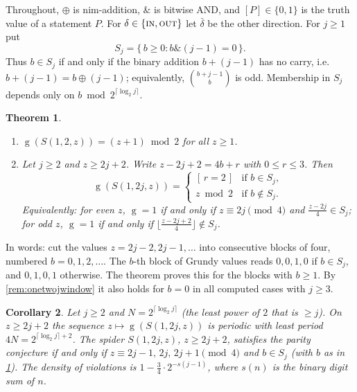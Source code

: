 \documentclass[11pt]{amsart}
\newtheorem{theorem}{Theorem}[section]
\newtheorem{corollary}[theorem]{Corollary}
\theoremstyle{definition}
\theoremstyle{remark}
\newcommand{\gv}{\operatorname{g}}           %
\newcommand{\Sp}{S}
\newcommand{\IN}{\textup{\textsc{in}}}
\newcommand{\OUT}{\textup{\textsc{out}}}
\begin{document}
Throughout, $\oplus$ is nim-addition, $\mathbin{\&}$ is bitwise AND, and $[P]\in\{0,1\}$ is the truth value of a statement $P$. For $\delta\in\{\IN,\OUT\}$ let $\bar\delta$ be the other direction. For $j\ge1$ put
\[
  S_j=\{\,b\ge 0 : b \mathbin{\&} (j-1)=0\,\}.
\]
Thus $b\in S_j$ if and only if the binary addition $b+(j-1)$ has no carry, i.e.\ $b+(j-1)=b\oplus(j-1)$; equivalently, $\binom{b+j-1}{b}$ is odd. Membership in $S_j$ depends only on $b \bmod 2^{\lceil\log_2 j\rceil}$.

\begin{theorem}\label{thm:onetwoj}
\leavevmode
\begin{enumerate}[label=\textup{(\alph*)}]
\item $\gv(\Sp(1,2,z))=(z+1)\bmod 2$ for all $z\ge1$.
\item Let $j\ge 2$ and $z\ge 2j+2$. Write $z-2j+2=4b+r$ with $0\le r\le 3$. Then
\[
  \gv(\Sp(1,2j,z))=\begin{cases} [\,r=2\,] & \text{if } b\in S_j,\\ z\bmod 2 & \text{if } b\notin S_j.\end{cases}
\]
Equivalently: for even $z$, $\gv=1$ if and only if $z\equiv 2j\pmod 4$ and $\tfrac{z-2j}{4}\in S_j$; for odd $z$, $\gv=1$ if and only if $\lfloor\tfrac{z-2j+2}{4}\rfloor\notin S_j$.
\end{enumerate}
\end{theorem}

In words: cut the values $z=2j-2,2j-1,\dots$ into consecutive blocks of four, numbered $b=0,1,2,\dots$. The $b$-th block of Grundy values reads $0,0,1,0$ if $b\in S_j$, and $0,1,0,1$ otherwise. The theorem proves this for the blocks with $b\ge1$. By \cref{rem:onetwojwindow} it also holds for $b=0$ in all computed cases with $j\ge3$.

\begin{corollary}\label{cor:onetwojperiod}
Let $j\ge2$ and $N=2^{\lceil \log_2 j\rceil}$ (the least power of $2$ that is $\ge j$). On $z\ge 2j+2$ the sequence $z\mapsto\gv(\Sp(1,2j,z))$ is periodic with least period $4N=2^{\lceil\log_2 j\rceil+2}$. The spider $\Sp(1,2j,z)$, $z\ge 2j+2$, satisfies the parity conjecture if and only if $z\equiv 2j-1,\,2j,\,2j+1 \pmod 4$ and $b\in S_j$ (with $b$ as in \cref{thm:onetwoj}). The density of violations is $1-\tfrac34\cdot 2^{-s(j-1)}$, where $s(n)$ is the binary digit sum of $n$.
\end{corollary}
\end{document}
